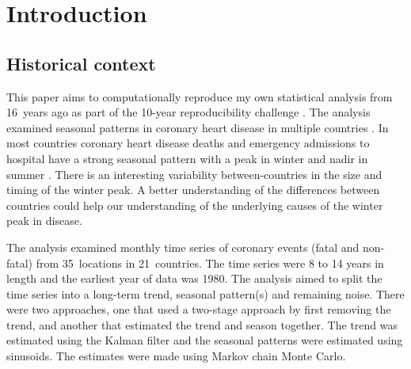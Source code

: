 \setlength{\parskip}{0.5\baselineskip}

\begin{quote}
\small
\articleABSTRACT
\end{quote}

\section{Introduction}

\subsection{Historical context}

This paper aims to computationally reproduce my own statistical analysis from 16~years ago as part of the 10-year reproducibility challenge \supercite{Hinsen2019}. The analysis examined seasonal patterns in coronary heart disease in multiple countries \supercite{Barnett2004}. In most countries coronary heart disease deaths and emergency admissions to hospital have a strong seasonal pattern with a peak in winter and nadir in summer \supercite{Stewart2017}. There is an interesting variability between-countries in the size and timing of the winter peak. A better understanding of the differences between countries could help our understanding of the underlying causes of the winter peak in disease.

The analysis examined monthly time series of coronary  events (fatal and non-fatal) from 35~locations in 21~countries. The time series were 8 to 14 years in length and the earliest year of data was 1980. The analysis aimed to split the time series into a long-term trend, seasonal pattern(s) and remaining noise. There were two approaches, one that used a two-stage approach by first removing the trend, and another that estimated the trend and season together. The trend was estimated using the Kalman filter and the seasonal patterns were estimated using sinusoids. The estimates were made using Markov chain Monte Carlo. 


